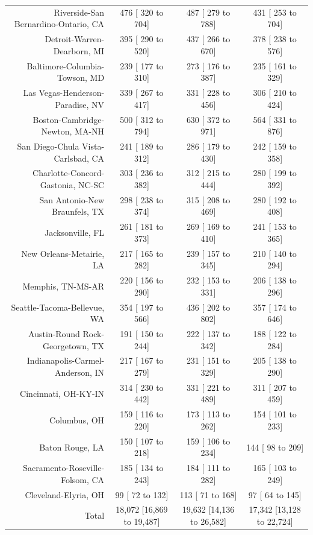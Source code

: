 \documentclass{article}
\begin{document}
\begin{table}[H]
\begin{tabular}{|r|c|c|c|}
		Riverside-San Bernardino-Ontario, CA &    476 [   320 to    704] &    487 [   279 to    788] &    431 [   253 to    704]\\
		Detroit-Warren-Dearborn, MI &    395 [   290 to    520] &    437 [   266 to    670] &    378 [   238 to    576]\\
		Baltimore-Columbia-Towson, MD &    239 [   177 to    310] &    273 [   176 to    387] &    235 [   161 to    329]\\
		Las Vegas-Henderson-Paradise, NV &    339 [   267 to    417] &    331 [   228 to    456] &    306 [   210 to    424]\\
		Boston-Cambridge-Newton, MA-NH &    500 [   312 to    794] &    630 [   372 to    971] &    564 [   331 to    876]\\
		San Diego-Chula Vista-Carlsbad, CA &    241 [   189 to    312] &    286 [   179 to    430] &    242 [   159 to    358]\\
		Charlotte-Concord-Gastonia, NC-SC &    303 [   236 to    382] &    312 [   215 to    444] &    280 [   199 to    392]\\
		San Antonio-New Braunfels, TX &    298 [   238 to    374] &    315 [   208 to    469] &    280 [   192 to    408]\\
		Jacksonville, FL &    261 [   181 to    373] &    269 [   169 to    410] &    241 [   153 to    365]\\
		New Orleans-Metairie, LA &    217 [   165 to    282] &    239 [   157 to    345] &    210 [   140 to    294]\\
		Memphis, TN-MS-AR &    220 [   156 to    290] &    232 [   153 to    331] &    206 [   138 to    296]\\
		Seattle-Tacoma-Bellevue, WA &    354 [   197 to    566] &    436 [   202 to    802] &    357 [   174 to    646]\\
		Austin-Round Rock-Georgetown, TX &    191 [   150 to    244] &    222 [   137 to    342] &    188 [   122 to    284]\\
		Indianapolis-Carmel-Anderson, IN &    217 [   167 to    279] &    231 [   151 to    329] &    205 [   138 to    290]\\
		Cincinnati, OH-KY-IN &    314 [   230 to    442] &    331 [   221 to    489] &    311 [   207 to    459]\\
		Columbus, OH &    159 [   116 to    220] &    173 [   113 to    262] &    154 [   101 to    233]\\
		Baton Rouge, LA &    150 [   107 to    218] &    159 [   106 to    234] &    144 [    98 to    209]\\
		Sacramento-Roseville-Folsom, CA &    185 [   134 to    243] &    184 [   111 to    282] &    165 [   103 to    249]\\
		Cleveland-Elyria, OH &     99 [    72 to    132] &    113 [    71 to    168] &     97 [    64 to    145]\\
		\hline
		Total & 18,072 [16,869 to 19,487] & 19,632 [14,136 to 26,582] & 17,342 [13,128 to 22,724]\\
		\hline
	\end{tabular}
\end{table}
\end{document}
